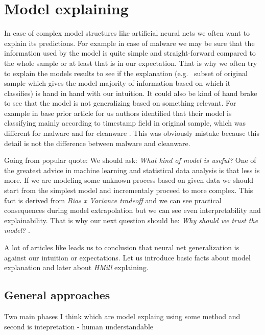\chapter{Model explaining}
In case of complex model structures like artificial neural nets we often want to explain its predictions. For example in case of malware we may be sure that the information used by the model is quite simple and straight-forward compared to the whole sample or at least that is in our expectation. That is why we often try to explain the models results to see if the explanation (e.g. \ subset of original sample which gives the model majority of information based on which it classifies) is hand in hand with our intuition. It could also be kind of hand brake to see that the model is not generalizing based on something relevant. For example in base prior article for us authors identified that their model is classifying mainly according to timestamp field in original sample, which was different for malware and for cleanware \cite{Pevny2020}. This was obviously mistake because this detail is not the difference between malware and cleanware.

Going from popular quote:   We should ask: \emph{What kind of model is useful?}
One of the greatest advice in machine learning and statistical data analysis is that less is more. If we are modeling some unknown process based on given data we should start from the simplest model and incrementaly proceed to more complex. This fact is derived from \emph{Bias x Variance tradeoff}  and we can see practical consequences during model extrapolation but we can see even interpretability and explainability. That is why our next question should be: \emph{Why should we trust the model?} \cite{Ribeiro2016}.

A lot of articles like \cite{Zhang2016} leads us to conclusion that neural net generalization is against our intuition or expectations. Let us introduce basic facts about model explanation and later about \emph{HMill} explaining.


\section{General approaches}

Two main phases I think which are model explaing using some method and second is intepretation - human understandable

